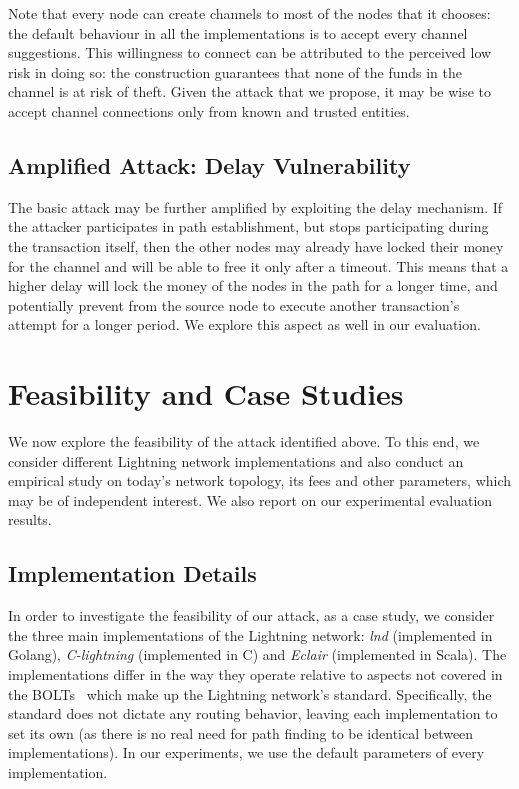 Note that every node can create channels to most of the nodes that it chooses:
the default behaviour in all the implementations is to accept every channel suggestions. This willingness to connect can be attributed to the perceived low risk in doing so: the construction guarantees that none of the funds in the channel is at risk of theft. Given the attack that we propose, it may be wise to accept channel connections only from known and trusted entities.

\subsection{Amplified Attack: Delay Vulnerability}

The basic attack may be further amplified
by exploiting the delay mechanism. 
    If the attacker participates in path establishment, 
    but stops participating during the transaction itself, then the other 
    nodes may already have locked their money for the channel
    and will be able to free it only after a timeout.
    This means that a higher delay will lock the money of the nodes in the path for a longer time, 
    and potentially prevent from the source node to execute another transaction's attempt for a longer period. We explore this aspect as well in our evaluation. 
    
\section{Feasibility and Case Studies}\label{sec::feasibility}

We now explore the feasibility of the attack identified
above. To this end, we consider different Lightning network implementations
and also conduct an empirical study on today's
network topology, its fees and other parameters, which may be of independent interest.
We also report on our experimental evaluation results.

\subsection{Implementation Details} \label{sec::imp_details}

In order to investigate the feasibility of our attack,
as a case study, we consider the three 
main implementations of the Lightning network: 
\emph{lnd} (implemented in Golang), \emph{C-lightning} (implemented in C) and 
\emph{Eclair} (implemented in Scala).
The implementations differ in the way they operate relative to aspects not covered
in the BOLTs~\cite{BOLT} which make up the Lightning network's standard. Specifically, the standard does not dictate any routing behavior, leaving each implementation to set its own (as there is no real need for path finding to be identical between implementations). In our experiments, we use the default parameters of every implementation.

